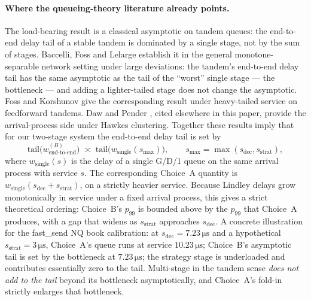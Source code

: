 \documentclass[11pt]{article}
\begin{document}
\paragraph{Where the queueing-theory literature already points.} The load-bearing result is a classical asymptotic on tandem queues: the end-to-end delay tail of a stable tandem is dominated by a single stage, not by the sum of stages. Baccelli, Foss and Lelarge \citep{baccellifosslelarge2005} establish it in the general monotone-separable network setting under large deviations: the tandem's end-to-end delay tail has the same asymptotic as the tail of the ``worst'' single stage --- the bottleneck --- and adding a lighter-tailed stage does not change the asymptotic. Foss and Korshunov \citep{fosskorshunov2000} give the corresponding result under heavy-tailed service on feedforward tandems. Daw and Pender \citep{dawpender2018queues}, cited elsewhere in this paper, provide the arrival-process side under Hawkes clustering. Together these results imply that for our two-stage system the end-to-end delay tail is set by
$$
\text{tail}\bigl(w_{\mathrm{end\text{-}to\text{-}end}}^{(B)}\bigr) \;\asymp\; \text{tail}\bigl(w_{\mathrm{single}}(s_{\max})\bigr), \qquad s_{\max} = \max(s_{\mathrm{dec}}, s_{\mathrm{strat}}),
$$
where $w_{\mathrm{single}}(s)$ is the delay of a single G/D/1 queue on the same arrival process with service $s$. The corresponding Choice~A quantity is $w_{\mathrm{single}}(s_{\mathrm{dec}} + s_{\mathrm{strat}})$, on a strictly heavier service. Because Lindley delays grow monotonically in service under a fixed arrival process, this gives a strict theoretical ordering: Choice~B's $p_{99}$ is bounded above by the $p_{99}$ that Choice~A produces, with a gap that widens as $s_{\mathrm{strat}}$ approaches $s_{\mathrm{dec}}$. A concrete illustration for the fast\_send NQ book calibration: at $s_{\mathrm{dec}} = 7.23\,\si{\micro\second}$ and a hypothetical $s_{\mathrm{strat}} = 3\,\si{\micro\second}$, Choice~A's queue runs at service $10.23\,\si{\micro\second}$; Choice~B's asymptotic tail is set by the bottleneck at $7.23\,\si{\micro\second}$; the strategy stage is underloaded and contributes essentially zero to the tail. Multi-stage in the tandem sense \emph{does not add to the tail} beyond its bottleneck asymptotically, and Choice~A's fold-in strictly enlarges that bottleneck.
\end{document}
